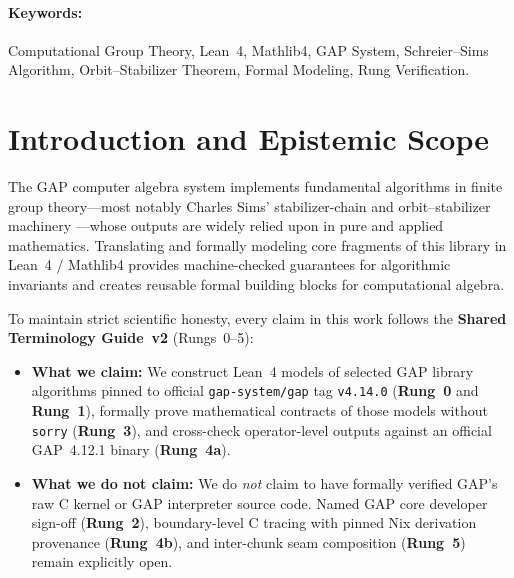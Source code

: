 \documentclass[11pt,a4paper]{article}
\begin{document}
\paragraph{Keywords:} Computational Group Theory, Lean~4, Mathlib4, GAP System, Schreier--Sims Algorithm, Orbit--Stabilizer Theorem, Formal Modeling, Rung Verification.

\section{Introduction and Epistemic Scope}

The GAP computer algebra system \cite{gap4} implements fundamental algorithms in finite group theory—most notably Charles Sims' stabilizer-chain and orbit--stabilizer machinery \cite{sims1970computational,seress2003permutation}—whose outputs are widely relied upon in pure and applied mathematics. Translating and formally modeling core fragments of this library in Lean~4 / Mathlib4 provides machine-checked guarantees for algorithmic invariants and creates reusable formal building blocks for computational algebra.

To maintain strict scientific honesty, every claim in this work follows the \textbf{Shared Terminology Guide~v2} (Rungs~0--5):
\begin{itemize}
  \item \textbf{What we claim:} We construct Lean~4 models of selected GAP library algorithms pinned to official \texttt{gap-system/gap} tag \texttt{v4.14.0} (\textbf{Rung~0} and \textbf{Rung~1}), formally prove mathematical contracts of those models without \texttt{sorry} (\textbf{Rung~3}), and cross-check operator-level outputs against an official GAP~4.12.1 binary (\textbf{Rung~4a}).
  \item \textbf{What we do not claim:} We do \emph{not} claim to have formally verified GAP's raw C kernel or GAP interpreter source code. Named GAP core developer sign-off (\textbf{Rung~2}), boundary-level C tracing with pinned Nix derivation provenance (\textbf{Rung~4b}), and inter-chunk seam composition (\textbf{Rung~5}) remain explicitly open.
\end{itemize}
\end{document}
